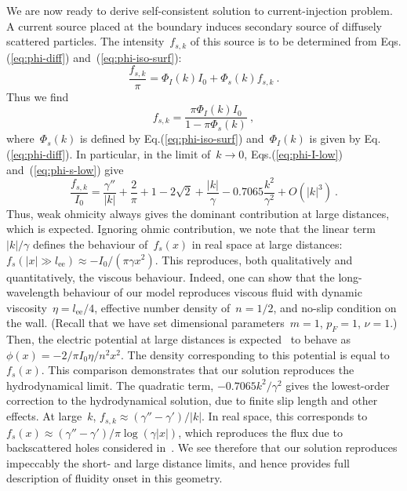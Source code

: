 \documentclass[preprint,aps,eqsecnum]{revtex4-1}
\begin{document}
We are now ready to derive self-consistent solution to current-injection
problem. A current source placed at the boundary induces secondary
source of diffusely scattered particles.
The intensity~$f_{s, k}$ of this source is to be determined from
Eqs.(\ref{eq:phi-diff}) and~(\ref{eq:phi-iso-surf}):
\begin{equation}
  \frac{f_{s, k}}{\pi} = \Phi_I(k) I_0 + \Phi_s(k) f_{s, k}
  \ .
\end{equation}
Thus we find
\begin{equation}
  f_{s, k} = \frac{\pi \Phi_I(k) I_0}{1 - \pi \Phi_s(k)}
  \ ,
\end{equation}
where~$\Phi_s(k)$ is defined by Eq.(\ref{eq:phi-iso-surf}) and~$\Phi_I(k)$
is given by Eq.(\ref{eq:phi-diff}). In particular, in the limit of~$k\to 0$,
Eqs.(\ref{eq:phi-I-low}) and~(\ref{eq:phi-s-low}) give
\begin{equation}
  \label{eq:fs-k=0}
  \frac{f_{s, k}}{I_0}
  = \frac{\gamma''}{|k|} + \frac{2}{\pi} + 1 - 2 \sqrt{2} + \frac{|k|}{\gamma} - 0.7065 \frac{k^2}{\gamma^2} + O(|k|^3)
  \ .
\end{equation}
Thus, weak ohmicity always gives the dominant contribution at large
distances, which is expected. Ignoring ohmic contribution, we
note that the linear term~$|k|/\gamma$ defines the behaviour of~$f_s(x)$
in real space at large distances:
$f_s(|x| \gg l_\mathrm{ee}) \approx -I_0/(\pi \gamma x^2)$. This
reproduces, both qualitatively and quantitatively, the viscous
behaviour. Indeed, one can show that the long-wavelength behaviour
of our model reproduces viscous fluid with dynamic
viscosity~$\eta = l_\mathrm{ee}/4$, effective number density of~$n = 1/2$,
and no-slip condition on the wall. (Recall that we have set dimensional
parameters~$m = 1$, $p_F = 1$, $\nu = 1$.)
Then, the electric potential at large distances
is expected~\cite{bib:Levitov-Falkovich}
to behave as $\phi(x) = - 2/\pi I_0 \eta / n^2 x^2$. The density
corresponding to this potential is equal to~$f_s(x)$. This comparison
demonstrates that our solution reproduces the hydrodynamical limit.
The quadratic term, $-0.7065 k^2/\gamma^2$ gives the lowest-order
correction to the hydrodynamical solution, due to finite slip length
and other effects.
At large~$k$, $f_{s, k} \approx (\gamma'' - \gamma') / |k|$.
In real space, this
corresponds to~$f_s(x) \approx  (\gamma'' - \gamma') / \pi \log(\gamma|x|)$,
which
reproduces the flux due to backscattered holes considered
in~\cite{bib:Shytov-et-al}. We see therefore that our solution reproduces
impeccably the short- and large distance limits, and hence provides
full description of fluidity onset in this geometry.
\end{document}
